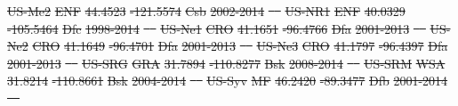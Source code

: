 \documentclass[hess, manuscript]{copernicus}
\providecommand{\DIFdeltex}[1]{{\protect\color{red}\sout{#1}}}                      %
\providecommand{\DIFdel}[1]{\texorpdfstring{\DIFdeltex{#1}}{}} %
\begin{document}
\DIFdel{US-Me2 }%
\DIFdel{ENF }%
\DIFdel{44.4523 }%
\DIFdel{-121.5574 }%
\DIFdel{Csb }%
\DIFdel{2002-2014 }%
\DIFdel{\mbox{%
\cite{US-Me2} }%
}%
\DIFdel{US-NR1 }%
\DIFdel{ENF }%
\DIFdel{40.0329 }%
\DIFdel{-105.5464 }%
\DIFdel{Dfc }%
\DIFdel{1998-2014 }%
\DIFdel{\mbox{%
\cite{US-NR1} }%
}%
\DIFdel{US-Ne1 }%
\DIFdel{CRO }%
\DIFdel{41.1651 }%
\DIFdel{-96.4766 }%
\DIFdel{Dfa }%
\DIFdel{2001-2013 }%
\DIFdel{\mbox{%
\cite{US-Ne1} }%
}%
\DIFdel{US-Ne2 }%
\DIFdel{CRO }%
\DIFdel{41.1649 }%
\DIFdel{-96.4701 }%
\DIFdel{Dfa }%
\DIFdel{2001-2013 }%
\DIFdel{\mbox{%
\cite{US-Ne1} }%
}%
\DIFdel{US-Ne3 }%
\DIFdel{CRO }%
\DIFdel{41.1797 }%
\DIFdel{-96.4397 }%
\DIFdel{Dfa }%
\DIFdel{2001-2013 }%
\DIFdel{\mbox{%
\cite{US-Ne1} }%
}%
\DIFdel{US-SRG }%
\DIFdel{GRA }%
\DIFdel{31.7894 }%
\DIFdel{-110.8277 }%
\DIFdel{Bsk }%
\DIFdel{2008-2014 }%
\DIFdel{\mbox{%
\cite{US-SRG} }%
}%
\DIFdel{US-SRM }%
\DIFdel{WSA }%
\DIFdel{31.8214 }%
\DIFdel{-110.8661 }%
\DIFdel{Bsk }%
\DIFdel{2004-2014 }%
\DIFdel{\mbox{%
\cite{US-SRM} }%
}%
\DIFdel{US-Syv }%
\DIFdel{MF }%
\DIFdel{46.2420 }%
\DIFdel{-89.3477 }%
\DIFdel{Dfb }%
\DIFdel{2001-2014 }%
\DIFdel{\mbox{%
\cite{US-Syv} }%
}%
\end{document}
